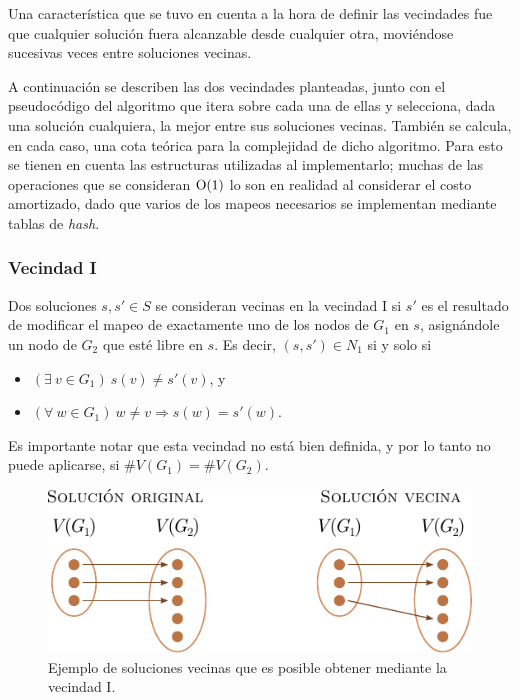 Una característica que se tuvo en cuenta a la hora de definir las vecindades
fue que cualquier solución fuera alcanzable desde cualquier otra, moviéndose
sucesivas veces entre soluciones vecinas.

A continuación se describen las dos vecindades planteadas, junto con el
pseudocódigo del algoritmo que itera sobre cada una de ellas y selecciona,
dada una solución cualquiera, la mejor entre sus soluciones vecinas. También
se calcula, en cada caso, una cota teórica para la complejidad de dicho
algoritmo. Para esto se tienen en cuenta las estructuras utilizadas al
implementarlo; muchas de las operaciones que se consideran $\operatorname{O}(1)$ lo son en
realidad al considerar el costo amortizado, dado que varios de los mapeos
necesarios se implementan mediante tablas de \emph{hash}.

\subsubsection{Vecindad I}
Dos soluciones $s, s' \in S$ se consideran vecinas en la vecindad I
si $s'$ es el resultado de modificar el mapeo de exactamente uno de los nodos
de $G_1$ en $s$, asignándole un nodo de $G_2$ que esté libre en $s$. Es
decir, $(s, s') \in N_1$ si y solo si
\begin{itemize}
    \item $(\exists \ v \in G_1)\ s(v) \neq s'(v)$, y
    \item $(\forall \ w \in G_1)\ w \neq v \Rightarrow s(w) = s'(w)$.
\end{itemize}

Es importante notar que esta vecindad no está bien definida, y por lo tanto no
puede aplicarse, si $\#V(G_1) = \#V (G_2)$.

\begin{figure}[htbp]
    \centering
    \includegraphics{imagenes/ex5_vecindad1.pdf}
    \caption{Ejemplo de soluciones vecinas que es posible obtener mediante la
    vecindad I.}
\end{figure}

